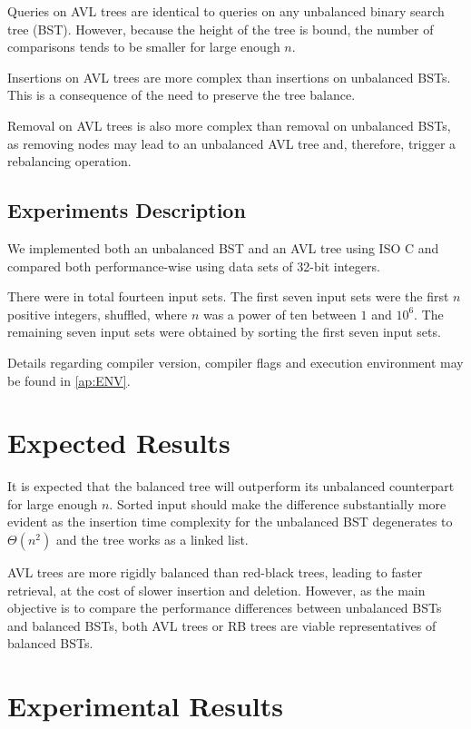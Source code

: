 \documentclass[12pt]{elsarticle}
\begin{document}
Queries on AVL trees are identical to queries on any unbalanced binary search
tree (BST). However, because the height of the tree is bound, the number of
comparisons tends to be smaller for large enough \(n\).

Insertions on AVL trees are more complex than insertions on unbalanced BSTs.
This is a consequence of the need to preserve the tree balance.

Removal on AVL trees is also more complex than removal on unbalanced BSTs, as
removing nodes may lead to an unbalanced AVL tree and, therefore, trigger a
rebalancing operation.

\subsection{Experiments Description}

We implemented both an unbalanced BST and an AVL tree using ISO C and compared
both performance-wise using data sets of 32-bit integers.

There were in total fourteen input sets. The first seven input sets were the
first \(n\) positive integers, shuffled, where \(n\) was a power of ten between
\(1\) and \(10^6\). The remaining seven input sets were obtained by sorting the
first seven input sets.

Details regarding compiler version, compiler flags and execution environment
may be found in \ref{ap:ENV}.

\section{Expected Results}

It is expected that the balanced tree will outperform its unbalanced
counterpart for large enough \(n\). Sorted input should make the difference
substantially more evident as the insertion time complexity for the unbalanced
BST degenerates to \(\Theta\left(n^2\right)\) and the tree works as a linked
list.

AVL trees are more rigidly balanced than red-black trees, leading to faster
retrieval, at the cost of slower insertion and deletion. However, as the main
objective is to compare the performance differences between unbalanced BSTs and
balanced BSTs, both AVL trees or RB trees are viable representatives of
balanced BSTs.

\section{Experimental Results}
\end{document}
